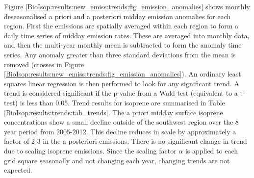       Figure \ref{BioIsop:results:new_emiss:trends:fig_emission_anomalies} shows monthly deseasonalised a priori and a posteriori midday emission anomalies for each region.
      First the emissions are spatially averaged within each region to form a daily time series of midday emission rates.
      These are averaged into monthly data, and then the multi-year monthly mean is subtracted to form the anomaly time series.
      Any anomaly greater than three standard deviations from the mean is removed (crosses in Figure \ref{BioIsop:results:new_emiss:trends:fig_emission_anomalies}).
      An ordinary least squares linear regression is then performed to look for any significant trend.
      A trend is considered significant if the p-value from a Wald test (equivalent to a t-test) is less than 0.05.
      Trend results for isoprene are summarised in Table \ref{BioIsop:results:trends:tab_trends}.
      The a priori midday surface isoprene concentrations show a small decline outside of the southwest region over the 8 year period from 2005-2012.
      This decline reduces in scale by approximately a factor of 2-3 in the a posteriori emissions.
      There is no significant change in trend due to scaling isoprene emissions.
      Since the scaling factor $\alpha$ is applied to each grid square seasonally and not changing each year, changing trends are not expected.
      
